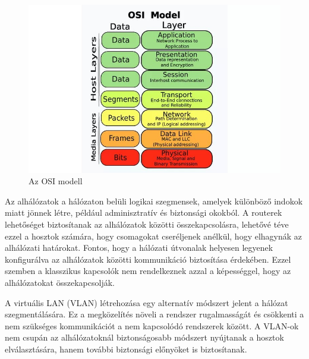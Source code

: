 \begin{figure}[H]
	\centering
	\includegraphics[width=150mm, keepaspectratio]{figures/osi_modell.jpg}
	\caption{Az OSI modell}
	\label {fig:osi_modell}
\end{figure}

Az alhálózatok a hálózaton belüli logikai szegmensek, amelyek különböző indokok miatt jönnek létre, 
például adminisztratív és biztonsági okokból. A routerek lehetőséget biztosítanak az alhálózatok 
közötti összekapcsolásra, lehetővé téve ezzel a hosztok számára, hogy csomagokat cseréljenek anélkül, 
hogy elhagynák az alhálózati határokat. Fontos, hogy a hálózati útvonalak helyesen legyenek 
konfigurálva az alhálózatok közötti kommunikáció biztosítása érdekében. 
Ezzel szemben a klasszikus kapcsolók nem rendelkeznek azzal a képességgel, hogy az alhálózatokat összekapcsolják.

A virtuális LAN (VLAN) létrehozása egy alternatív módszert jelent a hálózat szegmentálására. 
Ez a megközelítés növeli a rendszer rugalmasságát és csökkenti a nem szükséges kommunikációt 
a nem kapcsolódó rendszerek között. A VLAN-ok nem csupán az alhálózatoknál biztonságosabb 
módszert nyújtanak a hosztok elválasztására, hanem további biztonsági előnyöket is biztosítanak.

